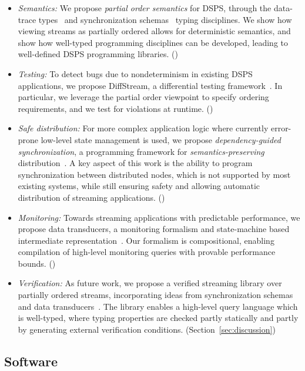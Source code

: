 \begin{itemize}
\item
\emph{Semantics:}
We propose \emph{partial order semantics} for DSPS,
through the data-trace types~ and synchronization schemas~ typing disciplines.
We show how viewing streams as partially ordered allows for deterministic semantics,
and show how well-typed programming disciplines can be developed,
leading to well-defined DSPS programming libraries.
()

\item
\emph{Testing:}
To detect bugs due to nondeterminism in existing DSPS applications,
we propose DiffStream, a differential testing framework~.
In particular, we leverage the partial order viewpoint to specify
ordering requirements, and we test for violations at runtime.
()

\item
\emph{Safe distribution:}
For more complex application logic where currently error-prone
low-level state management is used,
we propose \emph{dependency-guided synchronization},
a programming framework for \emph{semantics-preserving} distribution~.
A key aspect of this work is the ability to program
synchronization between distributed nodes, which is not supported
by most existing systems,
while still ensuring safety and allowing automatic distribution
of streaming applications.
()

\item
\emph{Monitoring:}
Towards streaming applications with predictable performance,
we propose data transducers, a monitoring formalism and state-machine based intermediate representation~.
Our formalism is compositional, enabling compilation of high-level
monitoring queries with provable performance bounds.
()

\item
\emph{Verification:}
As future work, we propose a verified streaming library
over partially ordered streams, incorporating ideas from synchronization schemas~ and data transducers~.
The library enables a high-level query language which is well-typed,
where typing properties are checked partly statically and partly by
generating external verification conditions.
(Section~\ref{sec:discussion})
\end{itemize}

\subsection{Software}
